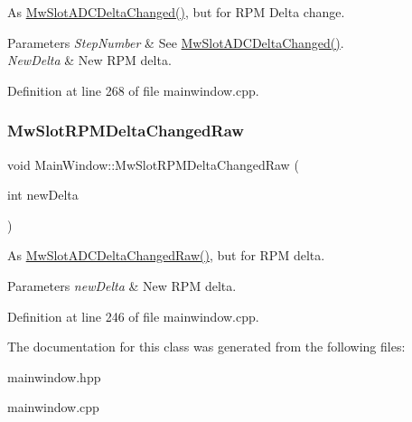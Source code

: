 As \hyperlink{class_main_window_a5778840f76f8ce6edd63d84b57b801b1}{Mw\+Slot\+A\+D\+C\+Delta\+Changed()}, but for R\+PM Delta change. 


\begin{DoxyParams}{Parameters}
{\em Step\+Number} & See \hyperlink{class_main_window_a5778840f76f8ce6edd63d84b57b801b1}{Mw\+Slot\+A\+D\+C\+Delta\+Changed()}. \\
\hline
{\em New\+Delta} & New R\+PM delta. \\
\hline
\end{DoxyParams}


Definition at line 268 of file mainwindow.\+cpp.

\mbox{\label{class_main_window_a4480e7516f91b93c8abc3d42c1284124}} 
\subsubsection{\texorpdfstring{Mw\+Slot\+R\+P\+M\+Delta\+Changed\+Raw}{MwSlotRPMDeltaChangedRaw}}
{\footnotesize\ttfamily void Main\+Window\+::\+Mw\+Slot\+R\+P\+M\+Delta\+Changed\+Raw (\begin{DoxyParamCaption}\item[{int}]{new\+Delta }\end{DoxyParamCaption})\hspace{0.3cm}{\ttfamily [slot]}}



As \hyperlink{class_main_window_acbdfd3592779f6946c4fecc33c79e9a4}{Mw\+Slot\+A\+D\+C\+Delta\+Changed\+Raw()}, but for R\+PM delta. 


\begin{DoxyParams}{Parameters}
{\em new\+Delta} & New R\+PM delta. \\
\hline
\end{DoxyParams}


Definition at line 246 of file mainwindow.\+cpp.



The documentation for this class was generated from the following files\+:\begin{DoxyCompactItemize}
\item 
mainwindow.\+hpp\item 
mainwindow.\+cpp\end{DoxyCompactItemize}
